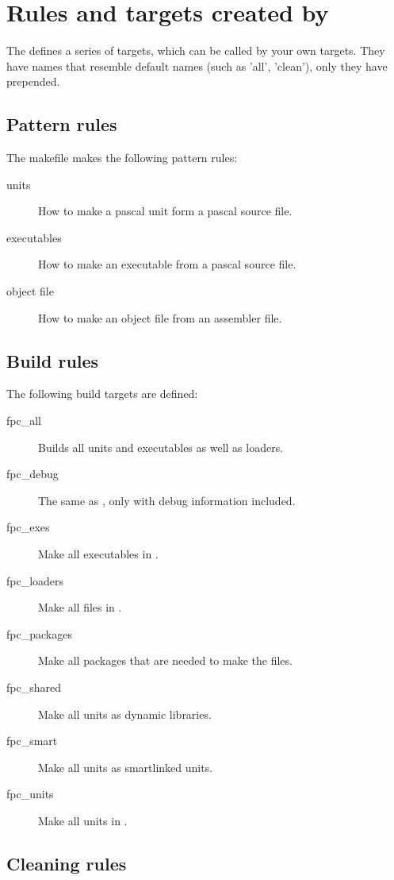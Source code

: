 \section{Rules and targets created by \fpcmake{}}

The  defines a series of targets, which can be called by
your own targets. They have names that resemble default names (such as
'all', 'clean'), only they have  prepended.

\subsection{Pattern rules}

The makefile makes the following pattern rules:
\begin{description}
\item[units] How to make a pascal unit form a pascal source file.
\item[executables] How to make an executable from a pascal source file.
\item[object file] How to make an object file from an assembler file.
\end{description}

\subsection{Build rules}

The following build targets are defined:
\begin{description}
\item[fpc\_all] Builds all units and executables as well as
loaders.
\item[fpc\_debug] The same as , only with debug information
included.
\item[fpc\_exes] Make all executables in .
\item[fpc\_loaders] Make all files in .
\item[fpc\_packages] Make all packages that are needed to make
the files.
\item[fpc\_shared] Make all units as dynamic libraries.
\item[fpc\_smart] Make all units as smartlinked units.
\item[fpc\_units] Make all units in .
\end{description}

\subsection{Cleaning rules}

